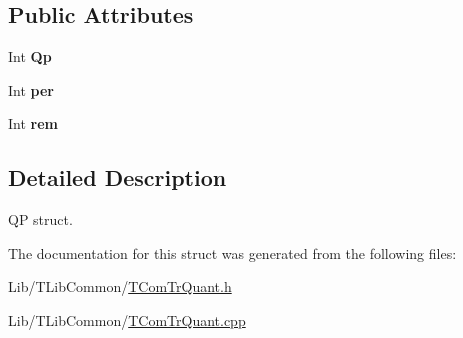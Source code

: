 \subsection*{Public Attributes}
\begin{DoxyCompactItemize}
\item 
\mbox{\label{struct_qp_param_acef365805e44a0b35ef79b7659ece664}} 
Int {\bfseries Qp}
\item 
\mbox{\label{struct_qp_param_ada71979d1382797e7e1d8835ec47d266}} 
Int {\bfseries per}
\item 
\mbox{\label{struct_qp_param_ab8c1d64d2561f8d9f388859e1733084d}} 
Int {\bfseries rem}
\end{DoxyCompactItemize}


\subsection{Detailed Description}
QP struct. 

The documentation for this struct was generated from the following files\+:\begin{DoxyCompactItemize}
\item 
Lib/\+T\+Lib\+Common/\hyperlink{_t_com_tr_quant_8h}{T\+Com\+Tr\+Quant.\+h}\item 
Lib/\+T\+Lib\+Common/\hyperlink{_t_com_tr_quant_8cpp}{T\+Com\+Tr\+Quant.\+cpp}\end{DoxyCompactItemize}
